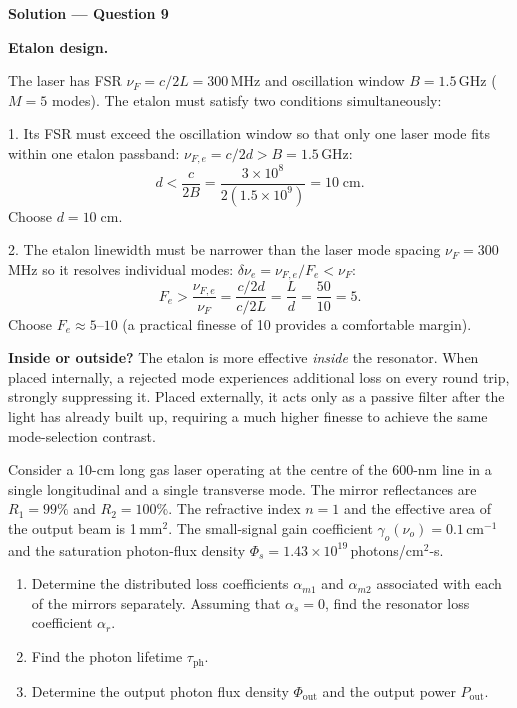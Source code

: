 \textbf{\large Solution --- Question 9}

\textbf{Etalon design.}

The laser has FSR $\nu_F = c/2L = 300$\,MHz and oscillation window $B = 1.5$\,GHz ($M = 5$ modes). The etalon must satisfy two conditions simultaneously:

1. Its FSR must exceed the oscillation window so that only one laser mode fits within one etalon passband: $\nu_{F,e} = c/2d > B = 1.5$\,GHz:
\begin{equation*}
  d < \frac{c}{2B} = \frac{3\times10^{8}}{2(1.5\times10^{9})} = 10\;\text{cm}.
\end{equation*}
Choose $\boxed{d = 10\;\text{cm}}$.

2. The etalon linewidth must be narrower than the laser mode spacing $\nu_F = 300$\,MHz so it resolves individual modes: $\delta\nu_e = \nu_{F,e}/F_e < \nu_F$:
\begin{equation*}
  F_e > \frac{\nu_{F,e}}{\nu_F} = \frac{c/2d}{c/2L} = \frac{L}{d} = \frac{50}{10} = 5.
\end{equation*}
Choose $\boxed{F_e \approx 5\text{--}10}$ (a practical finesse of 10 provides a comfortable margin).

\textbf{Inside or outside?} The etalon is more effective \emph{inside} the resonator. When placed internally, a rejected mode experiences additional loss on every round trip, strongly suppressing it. Placed externally, it acts only as a passive filter after the light has already built up, requiring a much higher finesse to achieve the same mode-selection contrast.


\begin{question}[Question 10]Consider a 10-cm long gas laser operating at the centre of the 600-nm line
in a single longitudinal and a single transverse mode. The mirror reflectances are $R_{1}=99\%$
and $R_{2}=100\%$. The refractive index $n=1$ and the effective area of the output beam is
1\,mm$^{2}$. The small-signal gain coefficient $\gamma_{o}(\nu_{o})=0.1$\,cm$^{-1}$ and the
saturation photon-flux density $\Phi_{s}=1.43\times10^{19}$\,photons/cm$^{2}$-s.
\begin{enumerate}[label=(\alph*)]
  \item Determine the distributed loss coefficients $\alpha_{m1}$ and $\alpha_{m2}$ associated
        with each of the mirrors separately. Assuming that $\alpha_{s}=0$, find the resonator
        loss coefficient $\alpha_{r}$.
  \item Find the photon lifetime $\tau_{\mathrm{ph}}$.
  \item Determine the output photon flux density $\Phi_{\mathrm{out}}$ and the output
        power $P_{\mathrm{out}}$.
\end{enumerate}
\end{question}

